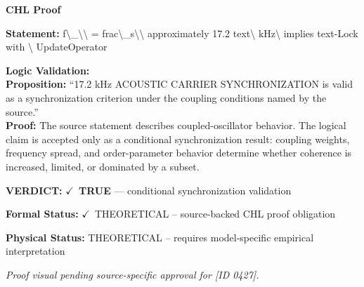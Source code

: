 \vspace{0.45em}
\noindent\textbf{CHL Proof}\par
\textbf{Statement:} f\textbackslash{}\_\textbackslash{}\textbackslash{} = frac\textbackslash{}\_s\textbackslash{}\textbackslash{} approximately 17.2 text\textbackslash{} kHz\textbackslash{} implies text-Lock with \textbackslash{} UpdateOperator

\textbf{Logic Validation:}\\
\textbf{Proposition:} ``17.2 kHz ACOUSTIC CARRIER SYNCHRONIZATION is valid as a synchronization criterion under
the coupling conditions named by the source.''\\
\textbf{Proof:} The source statement describes coupled-oscillator behavior. The logical claim is
accepted only as a conditional synchronization result: coupling weights, frequency
spread, and order-parameter behavior determine whether coherence is increased, limited,
or dominated by a subset.

\textbf{VERDICT:} \ensuremath{\checkmark}\ \textbf{TRUE} --- conditional synchronization validation

\textbf{Formal Status:} \ensuremath{\checkmark}\ THEORETICAL -- source-backed CHL proof obligation

\textbf{Physical Status:} THEORETICAL -- requires model-specific empirical interpretation
\par\vspace{0.45em}
\par
\vfill
\begingroup\footnotesize\itshape
Proof visual pending source-specific approval for [ID 0427].
\par\endgroup
\vfill
\endgroup
\endgroup
